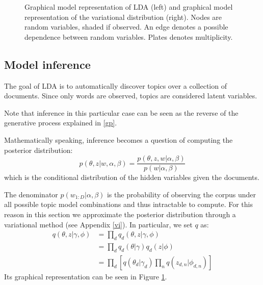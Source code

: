 \begin{figure}[h]
    \centering
    \caption{Graphical model representation of LDA (left) and graphical model representation of the variational distribution (right). Nodes are random variables, shaded if observed. An edge denotes a possible dependence between random variables. Plates denotes multiplicity.}
    \label{fig:lda}
\end{figure}

\subsection{Model inference}
The goal of LDA is to automatically discover topics over a collection of documents.
Since only words are observed, topics are considered latent variables.

Note that inference in this particular case can be seen as the reverse of the generative process explained in \ref{gp}.

Mathematically speaking, inference becomes a question of computing the posterior distribution:
$$ p(\theta, z | w, \alpha, \beta) = \frac{p(\theta, z, w | \alpha, \beta)}{p(w| \alpha, \beta)}$$
which is the conditional distribution of the hidden variables given the documents.

The denominator $p(w_{1:D} | \alpha, \beta)$ is the probability of observing the corpus under all possible topic model combinations
and thus intractable to compute.
For this reason in this section we approximate the posterior distribution through a variational method
(see Appendix \ref{vi}).
In particular, we set $q$ as:
\begin{equation*}
    \begin{split}
        q(\theta, z | \gamma, \phi) & = \prod_d q_d(\theta, z | \gamma, \phi) \\
        & = \prod_d q_d(\theta | \gamma) q_d(z | \phi) \\
        & = \prod_d [q(\theta_d | \gamma_d) \prod_n q(z_{d,n} | \phi_{d,n})]
    \end{split}
\end{equation*}
Its graphical representation can be seen in Figure \ref{fig:lda}.

